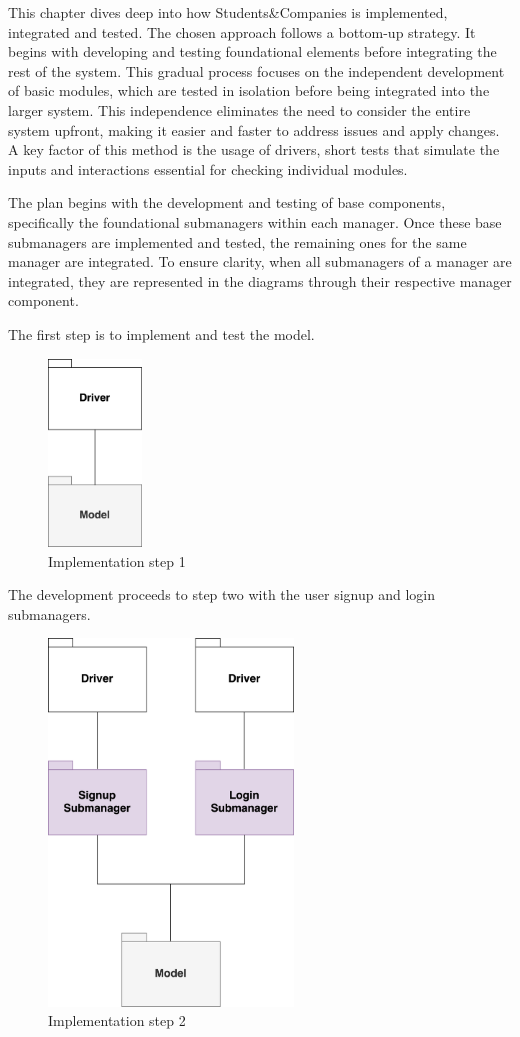 This chapter dives deep into how Students\&Companies is implemented, integrated and tested.
The chosen approach follows a bottom-up strategy.
It begins with developing and testing foundational elements before integrating the rest of the system.
This gradual process focuses on the independent development of basic modules, which are tested in isolation before being integrated into the larger system.
This independence eliminates the need to consider the entire system upfront, making it easier and faster to address issues and apply changes.
A key factor of this method is the usage of drivers, short tests that simulate the inputs and interactions essential for checking individual modules.

The plan begins with the development and testing of base components, specifically the foundational submanagers within each manager.
Once these base submanagers are implemented and tested, the remaining ones for the same manager are integrated. 
To ensure clarity, when all submanagers of a manager are integrated, they are represented in the diagrams through their respective manager component.

The first step is to implement and test the model.

\begin{figure}[h]
    \centering
    \includegraphics[width=2.5cm]{images/implementation-diagrams/step-1.png}
    \caption{Implementation step 1}
\end{figure}

\newpage
The development proceeds to step two with the user signup and login submanagers.

\begin{figure}[h]
    \centering
    \includegraphics[width=6.5cm]{images/implementation-diagrams/step-2.png}
    \caption{Implementation step 2}
\end{figure}

